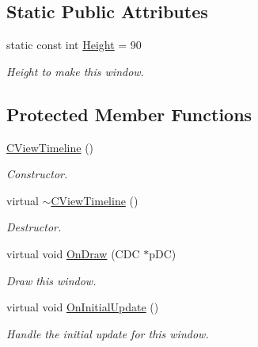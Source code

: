 \subsection*{Static Public Attributes}
\begin{DoxyCompactItemize}
\item 
\hypertarget{class_c_view_timeline_a6634479092090825e8c392902cf6c685}{static const int \hyperlink{class_c_view_timeline_a6634479092090825e8c392902cf6c685}{Height} = 90}\label{class_c_view_timeline_a6634479092090825e8c392902cf6c685}

\begin{DoxyCompactList}\small\item\em Height to make this window. \end{DoxyCompactList}\end{DoxyCompactItemize}
\subsection*{Protected Member Functions}
\begin{DoxyCompactItemize}
\item 
\hypertarget{class_c_view_timeline_aee8b6ebfaa9e299c65d6be0fc27b79f1}{\hyperlink{class_c_view_timeline_aee8b6ebfaa9e299c65d6be0fc27b79f1}{C\+View\+Timeline} ()}\label{class_c_view_timeline_aee8b6ebfaa9e299c65d6be0fc27b79f1}

\begin{DoxyCompactList}\small\item\em Constructor. \end{DoxyCompactList}\item 
\hypertarget{class_c_view_timeline_afec58a7cb0dfafd6c64c19e9e8a57842}{virtual \hyperlink{class_c_view_timeline_afec58a7cb0dfafd6c64c19e9e8a57842}{$\sim$\+C\+View\+Timeline} ()}\label{class_c_view_timeline_afec58a7cb0dfafd6c64c19e9e8a57842}

\begin{DoxyCompactList}\small\item\em Destructor. \end{DoxyCompactList}\item 
virtual void \hyperlink{class_c_view_timeline_a32f2ff1b162abc49f841e5dd6ddcb7df}{On\+Draw} (C\+D\+C $\ast$p\+D\+C)
\begin{DoxyCompactList}\small\item\em Draw this window. \end{DoxyCompactList}\item 
\hypertarget{class_c_view_timeline_a7996d31301f034cf9fa59e3d846c5fb5}{virtual void \hyperlink{class_c_view_timeline_a7996d31301f034cf9fa59e3d846c5fb5}{On\+Initial\+Update} ()}\label{class_c_view_timeline_a7996d31301f034cf9fa59e3d846c5fb5}

\begin{DoxyCompactList}\small\item\em Handle the initial update for this window. \end{DoxyCompactList}\end{DoxyCompactItemize}


